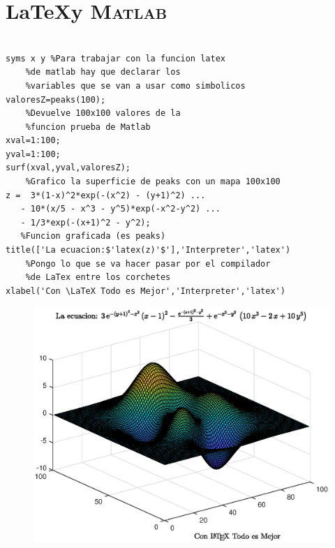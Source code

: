 \documentclass[11pt, a4paper,titlepage]{article}
\begin{document}
\section{\LaTeX\space y {\scshape Matlab}}
\begin{code}
\begin{verbatim}

syms x y %Para trabajar con la funcion latex 
    %de matlab hay que declarar los
    %variables que se van a usar como simbolicos
valoresZ=peaks(100); 
    %Devuelve 100x100 valores de la
    %funcion prueba de Matlab
xval=1:100;
yval=1:100;
surf(xval,yval,valoresZ); 
    %Grafico la superficie de peaks con un mapa 100x100
z =  3*(1-x)^2*exp(-(x^2) - (y+1)^2) ... 
   - 10*(x/5 - x^3 - y^5)*exp(-x^2-y^2) ... 
   - 1/3*exp(-(x+1)^2 - y^2); 
   %Funcion graficada (es peaks)
title(['La ecuacion:$'latex(z)'$'],'Interpreter','latex')
    %Pongo lo que se va hacer pasar por el compilador
    %de LaTex entre los corchetes
xlabel('Con \LaTeX Todo es Mejor','Interpreter','latex')
\end{verbatim}
\end{code}
\begin{figure}[h]
\centering
\includegraphics[width=\textwidth]{graf/g6.eps}
\end{figure}
\end{document}
